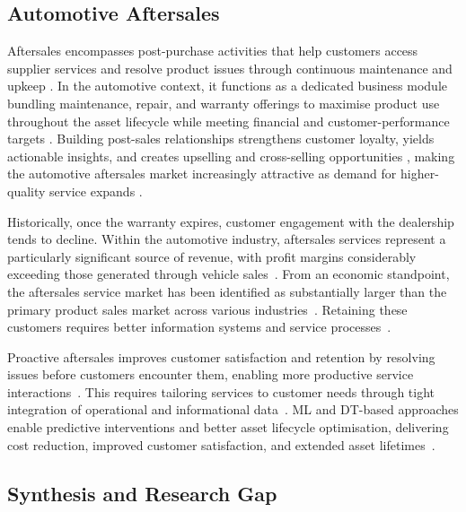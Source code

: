 \documentclass[conference,a4paper]{IEEEtran}
\begin{document}
\subsection{Automotive Aftersales}

Aftersales encompasses post-purchase activities that help customers access supplier services and resolve product issues through continuous maintenance and upkeep \cite{mertins_servitization_1999}. In the automotive context, it functions as a dedicated business module bundling maintenance, repair, and warranty offerings to maximise product use throughout the asset lifecycle while meeting financial and customer-performance targets \cite{sabbagha_impact_2016,balinado_effect_2021}. Building post-sales relationships strengthens customer loyalty, yields actionable insights, and creates upselling and cross-selling opportunities \cite{peters1997it}, making the automotive aftersales market increasingly attractive as demand for higher-quality service expands \cite{sabbagha_impact_2016}.  

Historically, once the warranty expires, customer engagement with the dealership tends to decline. Within the automotive industry, aftersales services represent a particularly significant source of revenue, with profit margins considerably exceeding those generated through vehicle sales~\cite{macbryde_role_2006}. From an economic standpoint, the aftersales service market has been identified as substantially larger than the primary product sales market across various industries~\cite{bundschuh_how_2003,editorial_universitat_politecnica_de_valencia_impact_2015,wise_go_2000}. Retaining these customers requires better information systems and service processes~\cite{mertins_servitization_1999}.

Proactive aftersales improves customer satisfaction and retention by resolving issues before customers encounter them, enabling more productive service interactions~\cite{challagalla_proactive_2009}. This requires tailoring services to customer needs through tight integration of operational and informational data~\cite{mertins_servitization_1999}. ML and DT-based approaches enable predictive interventions and better asset lifecycle optimisation, delivering cost reduction, improved customer satisfaction, and extended asset lifetimes~\cite{gonzalez-pridaDigitalTransformationAftersales2025}.


\subsection{Synthesis and Research Gap}
\end{document}

